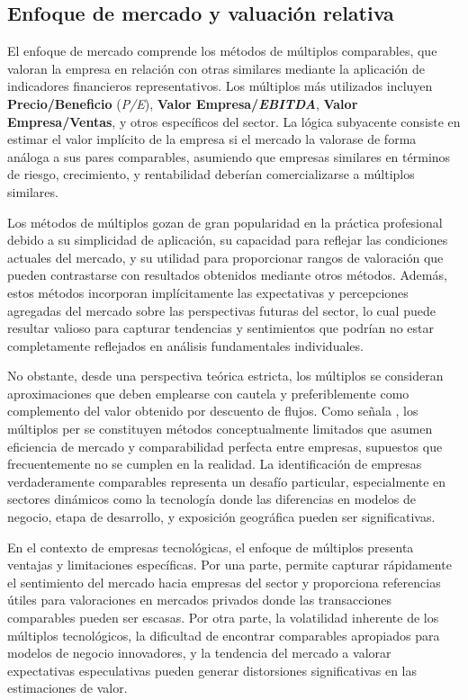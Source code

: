 \subsection{Enfoque de mercado y valuación relativa}

El enfoque de mercado comprende los métodos de múltiplos comparables, que valoran la empresa en relación con otras similares mediante la aplicación de indicadores financieros representativos. Los múltiplos más utilizados incluyen \textbf{Precio/Beneficio} (\emph{P/E}), \textbf{Valor Empresa/\emph{EBITDA}}, \textbf{Valor Empresa/Ventas}, y otros específicos del sector. La lógica subyacente consiste en estimar el valor implícito de la empresa si el mercado la valorase de forma análoga a sus pares comparables, asumiendo que empresas similares en términos de riesgo, crecimiento, y rentabilidad deberían comercializarse a múltiplos similares.

Los métodos de múltiplos gozan de gran popularidad en la práctica profesional debido a su simplicidad de aplicación, su capacidad para reflejar las condiciones actuales del mercado, y su utilidad para proporcionar rangos de valoración que pueden contrastarse con resultados obtenidos mediante otros métodos. Además, estos métodos incorporan implícitamente las expectativas y percepciones agregadas del mercado sobre las perspectivas futuras del sector, lo cual puede resultar valioso para capturar tendencias y sentimientos que podrían no estar completamente reflejados en análisis fundamentales individuales.

No obstante, desde una perspectiva teórica estricta, los múltiplos se consideran aproximaciones que deben emplearse con cautela y preferiblemente como complemento del valor obtenido por descuento de flujos. Como señala \cite{fernandez2007}, los múltiplos per se constituyen métodos conceptualmente limitados que asumen eficiencia de mercado y comparabilidad perfecta entre empresas, supuestos que frecuentemente no se cumplen en la realidad. La identificación de empresas verdaderamente comparables representa un desafío particular, especialmente en sectores dinámicos como la tecnología donde las diferencias en modelos de negocio, etapa de desarrollo, y exposición geográfica pueden ser significativas.

En el contexto de empresas tecnológicas, el enfoque de múltiplos presenta ventajas y limitaciones específicas. Por una parte, permite capturar rápidamente el sentimiento del mercado hacia empresas del sector y proporciona referencias útiles para valoraciones en mercados privados donde las transacciones comparables pueden ser escasas. Por otra parte, la volatilidad inherente de los múltiplos tecnológicos, la dificultad de encontrar comparables apropiados para modelos de negocio innovadores, y la tendencia del mercado a valorar expectativas especulativas pueden generar distorsiones significativas en las estimaciones de valor.

